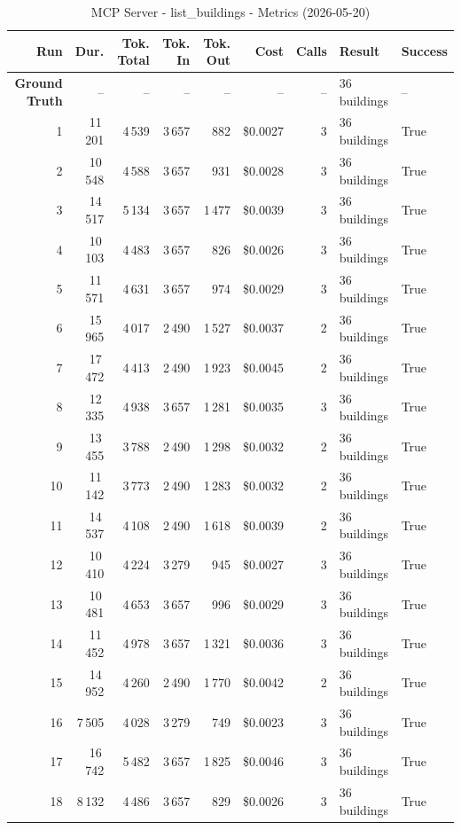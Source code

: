 \documentclass[a4paper,11pt]{article}
\begin{document}
\begin{table}[ht]
\centering
\scriptsize
\caption{MCP Server - list\_buildings - Metrics (2026-05-20)}
\label{tab:mcp\_list\_buildings\_metrics\_2026-05-20}
\begin{tabular}{r r r r r r r p{3cm} l}
\hline
Run & Dur. & Tok. Total & Tok. In & Tok. Out & Cost & Calls & Result & Success \\
\hline
\textbf{Ground Truth} & -- & -- & -- & -- & -- & -- & 36 buildings & -- \\
\hline
1 & 11\,201 & 4\,539 & 3\,657 & 882 & \$0.0027 & 3 & 36 buildings & True \\
2 & 10\,548 & 4\,588 & 3\,657 & 931 & \$0.0028 & 3 & 36 buildings & True \\
3 & 14\,517 & 5\,134 & 3\,657 & 1\,477 & \$0.0039 & 3 & 36 buildings & True \\
4 & 10\,103 & 4\,483 & 3\,657 & 826 & \$0.0026 & 3 & 36 buildings & True \\
5 & 11\,571 & 4\,631 & 3\,657 & 974 & \$0.0029 & 3 & 36 buildings & True \\
6 & 15\,965 & 4\,017 & 2\,490 & 1\,527 & \$0.0037 & 2 & 36 buildings & True \\
7 & 17\,472 & 4\,413 & 2\,490 & 1\,923 & \$0.0045 & 2 & 36 buildings & True \\
8 & 12\,335 & 4\,938 & 3\,657 & 1\,281 & \$0.0035 & 3 & 36 buildings & True \\
9 & 13\,455 & 3\,788 & 2\,490 & 1\,298 & \$0.0032 & 2 & 36 buildings & True \\
10 & 11\,142 & 3\,773 & 2\,490 & 1\,283 & \$0.0032 & 2 & 36 buildings & True \\
11 & 14\,537 & 4\,108 & 2\,490 & 1\,618 & \$0.0039 & 2 & 36 buildings & True \\
12 & 10\,410 & 4\,224 & 3\,279 & 945 & \$0.0027 & 3 & 36 buildings & True \\
13 & 10\,481 & 4\,653 & 3\,657 & 996 & \$0.0029 & 3 & 36 buildings & True \\
14 & 11\,452 & 4\,978 & 3\,657 & 1\,321 & \$0.0036 & 3 & 36 buildings & True \\
15 & 14\,952 & 4\,260 & 2\,490 & 1\,770 & \$0.0042 & 2 & 36 buildings & True \\
16 & 7\,505 & 4\,028 & 3\,279 & 749 & \$0.0023 & 3 & 36 buildings & True \\
17 & 16\,742 & 5\,482 & 3\,657 & 1\,825 & \$0.0046 & 3 & 36 buildings & True \\
18 & 8\,132 & 4\,486 & 3\,657 & 829 & \$0.0026 & 3 & 36 buildings & True \\

\end{tabular}
\end{table}
\end{document}
